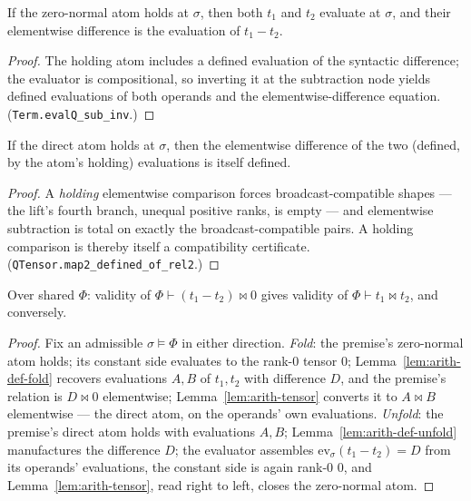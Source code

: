 \begin{blemma}\label{lem:arith-def-fold}
If the zero-normal atom holds at $\sigma$, then both $t_1$ and $t_2$
evaluate at $\sigma$, and their elementwise difference is the evaluation
of $t_1 - t_2$.
\end{blemma}
\begin{proof}
The holding atom includes a defined evaluation of the syntactic
difference; the evaluator is compositional, so inverting it at the
subtraction node yields defined evaluations of both operands and the
elementwise-difference equation. (\texttt{Term.evalQ\_sub\_inv}.)
\end{proof}

\begin{blemma}\label{lem:arith-def-unfold}
If the direct atom holds at $\sigma$, then the elementwise difference of
the two (defined, by the atom's holding) evaluations is itself defined.
\end{blemma}
\begin{proof}
A \emph{holding} elementwise comparison forces broadcast-compatible
shapes --- the lift's fourth branch, unequal positive ranks, is empty ---
and elementwise subtraction is total on exactly the broadcast-compatible
pairs. A holding comparison is thereby itself a compatibility
certificate. (\texttt{QTensor.map2\_defined\_of\_rel2}.)
\end{proof}

\begin{bthm}
\label{thm:arith-sound}
Over shared $\Phi$: validity of $\Phi \vdash (t_1 - t_2) \bowtie 0$
gives validity of $\Phi \vdash t_1 \bowtie t_2$, and conversely.
\end{bthm}
\begin{proof}
Fix an admissible $\sigma \models \Phi$ in either direction.
\emph{Fold}: the premise's zero-normal atom holds; its constant side
evaluates to the rank-0 tensor $0$; Lemma~\ref{lem:arith-def-fold}
recovers evaluations $A, B$ of $t_1, t_2$ with difference $D$, and the
premise's relation is $D \bowtie 0$ elementwise;
Lemma~\ref{lem:arith-tensor} converts it to $A \bowtie B$ elementwise
--- the direct atom, on the operands' own evaluations. \emph{Unfold}:
the premise's direct atom holds with evaluations $A, B$;
Lemma~\ref{lem:arith-def-unfold} manufactures the difference $D$; the
evaluator assembles $\mathrm{ev}_\sigma(t_1 - t_2) = D$ from its
operands' evaluations, the constant side is again rank-0 $0$, and
Lemma~\ref{lem:arith-tensor}, read right to left, closes the zero-normal
atom.
\end{proof}

